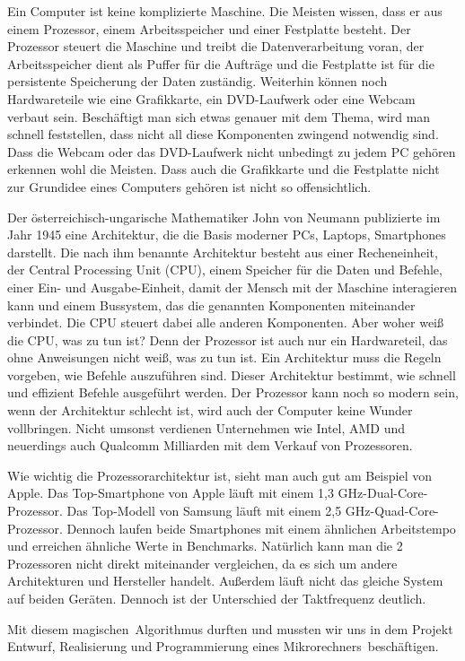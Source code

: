 Ein Computer ist keine komplizierte Maschine. Die Meisten wissen, dass er aus einem Prozessor, einem Arbeitsspeicher und einer Festplatte besteht. Der Prozessor steuert die Maschine und treibt die Datenverarbeitung voran, der Arbeitsspeicher dient als Puffer für die Aufträge und die Festplatte ist für die persistente Speicherung der Daten zuständig. Weiterhin können noch Hardwareteile wie eine Grafikkarte, ein DVD-Laufwerk oder eine Webcam verbaut sein.
Beschäftigt man sich etwas genauer mit dem Thema, wird man schnell feststellen, dass nicht all diese Komponenten zwingend notwendig sind. Dass die Webcam oder das DVD-Laufwerk nicht unbedingt zu jedem PC gehören erkennen wohl die Meisten. Dass auch die Grafikkarte und die Festplatte nicht zur Grundidee eines Computers gehören ist nicht so offensichtlich.

Der österreichisch-ungarische Mathematiker John von Neumann publizierte im Jahr 1945 eine Architektur, die die Basis moderner PCs, Laptops, Smartphones darstellt.
Die nach ihm benannte Architektur besteht aus einer Recheneinheit, der Central Processing Unit (CPU), einem Speicher für die Daten und Befehle, einer Ein- und Ausgabe-Einheit, damit der Mensch mit der Maschine interagieren kann und einem Bussystem, das die genannten Komponenten miteinander verbindet. Die CPU steuert dabei alle anderen Komponenten. Aber woher weiß die CPU, was zu tun ist? Denn der Prozessor ist auch nur ein Hardwareteil, das ohne Anweisungen nicht weiß, was zu tun ist. Ein Architektur muss die Regeln vorgeben, wie Befehle auszuführen sind. Dieser Architektur bestimmt, wie schnell und effizient Befehle ausgeführt werden. Der Prozessor kann noch so modern sein, wenn der Architektur schlecht ist, wird auch der Computer keine Wunder vollbringen. Nicht umsonst verdienen Unternehmen wie Intel, AMD und neuerdings auch Qualcomm Milliarden mit dem Verkauf von Prozessoren. 

Wie wichtig die Prozessorarchitektur ist, sieht man auch gut am Beispiel von Apple. Das Top-Smartphone von Apple läuft mit einem 1,3 GHz-Dual-Core-Prozessor. Das Top-Modell von Samsung läuft mit einem 2,5 GHz-Quad-Core-Prozessor. Dennoch laufen beide Smartphones mit einem ähnlichen Arbeitstempo und erreichen ähnliche Werte in Benchmarks. Natürlich kann man die 2 Prozessoren nicht direkt miteinander vergleichen, da es sich um andere Architekturen und Hersteller handelt. Außerdem läuft nicht das gleiche System auf beiden Geräten. Dennoch ist der Unterschied der Taktfrequenz deutlich.

Mit diesem \glqq magischen\grqq \ Algorithmus durften und mussten wir uns in dem Projekt \glqq Entwurf, Realisierung und Programmierung eines Mikrorechners\grqq \ beschäftigen. 

